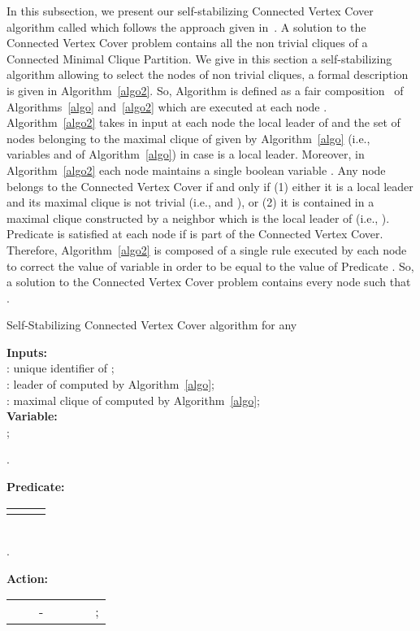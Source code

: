 \documentclass[11pt,letterpaper,onecolumn]{article}
\begin{document}
In this subsection, we present our self-stabilizing Connected Vertex Cover algorithm called  which follows the approach given in~\cite{DelbotLP13}. A solution to the Connected Vertex Cover problem contains all the non trivial cliques of a Connected Minimal Clique Partition. We give in this section a self-stabilizing algorithm allowing to select the nodes of non trivial cliques, a formal description is given in Algorithm~\ref{algo2}. So, Algorithm  is defined as a fair composition~\cite{Dolev2000} of Algorithms~\ref{algo} and~\ref{algo2} which are executed at each node .\\
Algorithm~\ref{algo2} takes in input at each node  the local leader of  and the set of nodes belonging to the maximal clique of  given by Algorithm~\ref{algo} (i.e., variables  and  of Algorithm~\ref{algo}) in case  is a local leader. Moreover, in Algorithm~\ref{algo2} each node maintains a single boolean variable . Any node  belongs to the Connected Vertex Cover if and only if (1) either it is a local leader and its maximal clique is not trivial (i.e.,  and ), or (2) it is contained in a maximal clique constructed by a neighbor which is the local leader of  (i.e., ). Predicate  is satisfied at each node  if  is part of the Connected Vertex Cover. Therefore, Algorithm~\ref{algo2} is composed of a single rule executed by each node  to correct the value of variable  in order to be equal to the value of Predicate . So, a solution to the Connected Vertex Cover problem contains every node  such that .

\begin{algorithm}
\caption{\quad Self-Stabilizing Connected Vertex Cover algorithm for any \label{algo2}}
\smallskip
\begin{scriptsize}
{\bf Inputs:}\\
\hspace*{1cm}: unique identifier of ;\\
\hspace*{1cm}: leader of  computed by Algorithm~\ref{algo};\\
\hspace*{1cm}: maximal clique of  computed by Algorithm~\ref{algo};\\
{\bf Variable:}\\
\hspace*{1cm};

.\dotfill\ 

{\bf Predicate:}\\
\begin{tabular}{lll}
 &  & \\
\end{tabular}\\
.\dotfill\

{\bf Action:}\\
\begin{tabular}{lllllll}
&& -  &  &  &  & ;\\
\end{tabular}
\end{scriptsize}
\end{algorithm}
\end{document}
